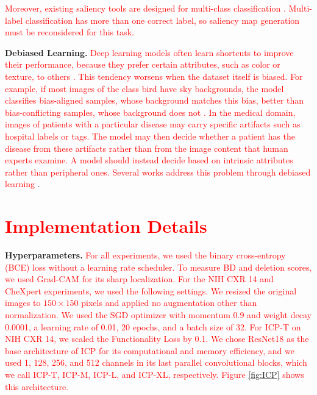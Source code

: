 \documentclass[preprint,7pt, a4paper]{elsarticle}
\begin{document}
\textcolor{red}{Moreover, existing saliency tools are designed for multi-class classification \cite{4,1,2,5,6,7,10}. Multi-label classification has more than one correct label, so saliency map generation must be reconsidered for this task.} 

\textbf{Debiased Learning.} \textcolor{red}{Deep learning models often learn shortcuts \cite{31} to improve their performance, because they prefer certain attributes, such as color or texture, to others \cite{32}. This tendency worsens when the dataset itself is biased. For example, if most images of the class bird have sky backgrounds, the model classifies bias-aligned samples, whose background matches this bias, better than bias-conflicting samples, whose background does not \cite{33}. In the medical domain, images of patients with a particular disease may carry specific artifacts such as hospital labels or tags. The model may then decide whether a patient has the disease from these artifacts rather than from the image content that human experts examine. A model should instead decide based on intrinsic attributes rather than peripheral ones. Several works address this problem through debiased learning} \cite{34, 35, 36, 37, 38, 39, 40}.

\section{\textcolor{red}{Implementation Details}}

\label{Appendix2}

\textbf{Hyperparameters.} \textcolor{red}{For all experiments, we used the binary cross-entropy (BCE) loss without a learning rate scheduler. To measure BD and deletion scores, we used Grad-CAM for its sharp localization. For the NIH CXR 14 and CheXpert experiments, we used the following settings. We resized the original images to $150 \times 150$ pixels and applied no augmentation other than normalization. We used the SGD optimizer \cite{50} with momentum 0.9 and weight decay 0.0001, a learning rate of 0.01, 20 epochs, and a batch size of 32. For ICP-T on NIH CXR 14, we scaled the Functionality Loss by 0.1. We chose ResNet18 \cite{49} as the base architecture of ICP for its computational and memory efficiency, and we used 1, 128, 256, and 512 channels in its last parallel convolutional blocks, which we call ICP-T, ICP-M, ICP-L, and ICP-XL, respectively. Figure \ref{fig:ICP} shows this architecture.}
\end{document}
